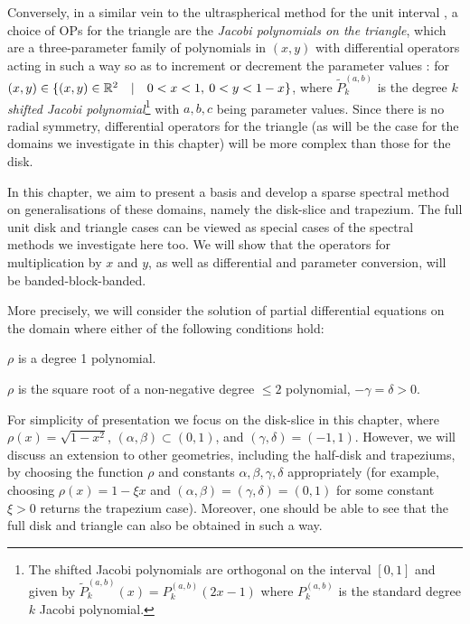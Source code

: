 Conversely, in a similar vein to the ultraspherical method for the unit interval \cite{olver2013fast, doha2009efficient}, a choice of OPs for the triangle are the \textit{Jacobi polynomials on the triangle}, which are a three-parameter family of polynomials in $(x,y)$ with differential operators acting in such a way so as to increment or decrement the parameter values \cite{dunkl2014orthogonal, koornwinder1975two, olver2019triangle}:
for $(x,y) \in \{ (x,y) \in \mathbb{R}^2 \quad | \quad 0 < x < 1, \: 0 < y < 1-x \}$, where $\tilde P_k^{(a,b)}$ is the degree $k$ \textit{shifted Jacobi polynomial}\footnote{The shifted Jacobi polynomials are orthogonal on the interval $[0,1]$ and given by $\tilde P_k^{(a,b)}(x) = P_k^{(a,b)}(2x - 1)$ where $P_k^{(a,b)}$ is the standard degree $k$ Jacobi polynomial.} with $a,b,c$ being parameter values. Since there is no radial symmetry, differential operators for the triangle (as will be the case for the domains we investigate in this chapter) will be more complex than those for the disk.

In this chapter, we aim to present a basis and develop a sparse spectral method on generalisations of these domains, namely the disk-slice and trapezium. The full unit disk and triangle cases can be viewed as special cases of the spectral methods we investigate here too. We will show that the operators for multiplication by $x$ and $y$, as well as differential and parameter conversion, will be banded-block-banded.

More precisely, we will consider the solution of partial differential equations on the domain
where  either of the following conditions hold:

\begin{condition}\label{cond:trap}
	$\rho$ is a degree 1 polynomial.
\end{condition}
\begin{condition}\label{cond:disk}
	$\rho$ is the square root of a non-negative degree $\le 2$ polynomial, $-\gamma = \delta > 0$.
\end{condition}

For simplicity of presentation we focus on the disk-slice in this chapter, where $\rho(x) = \sqrt{1-x^2}$, $(\alpha,\beta) \subset (0, 1)$, and $(\gamma, \delta)  = (-1,1)$. However, we will discuss an extension to other geometries, including the half-disk and trapeziums, by choosing the function $\rho$ and constants $\alpha, \beta, \gamma, \delta$ appropriately (for example, choosing $\rho(x) = 1-\xi x$ and $(\alpha,\beta) = (\gamma, \delta) = (0, 1)$ for some constant $\xi > 0$ returns the trapezium case). Moreover, one should be able to see that the full disk and triangle can also be obtained in such a way.

